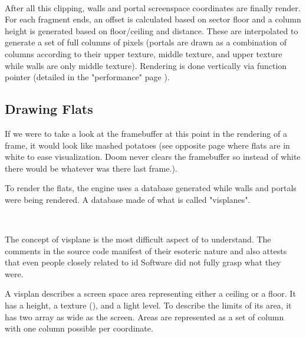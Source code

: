 \\

 \vspace{10mm}















\vspace{-4mm}
After all this clipping, walls and portal screenspace coordinates are finally render. For each fragment ends, an  offset is calculated based on sector floor and a column height is generated based on floor/ceiling and distance. These are interpolated to generate a set of full columns of pixels (portals are drawn as a combination of columns according to their upper texture, middle texture, and upper texture while walls are only middle texture). Rendering is done vertically via  function pointer (detailed in the "performance" page \pageref{performances}).\\

\par
\subsection{Drawing Flats}
 If we were to take a look at the framebuffer at this point in the rendering of a frame, it would look like mashed potatoes (see opposite page where flats are in white to ease visualization. Doom never clears the framebuffer so instead of white there would be whatever was there last frame.).\\
\par
To render the flats, the engine uses a database generated while walls and portals were being rendered. A database made of what is called "visplanes".\\
\par
{}\\
\par
The concept of visplane is the most difficult aspect of \doom{} to understand. The comments in the source code manifest of their esoteric nature and also attests that even people closely related to id Software did not fully grasp what they were.\\
\par
A visplan describes a screen space area representing either a ceiling or a floor. It has a height, a texture (), and a light level. To describe the limits of its area, it has two array as wide as the screen. Areas are represented as a set of column with one column possible per  coordinate.
\par


